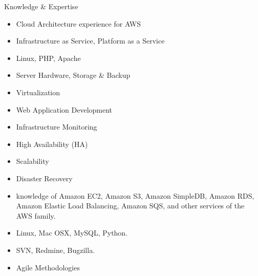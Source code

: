 \documentclass[a4paper,12pt]{article}
\begin{document}
\begin{resumesummary}{Knowledge \& Expertise}
\begin{itemize}
  \item Cloud Architecture experience for AWS
  \item Infrastructure as Service, Platform as a Service
  \item Linux, PHP, Apache
  \item Server Hardware, Storage \& Backup
  \item Virtualization
  \item Web Application Development
  \item Infrastructure Monitoring
  \item High Availability (HA)
  \item Scalability
  \item Disaster Recovery
  \item knowledge of Amazon EC2, Amazon S3, Amazon SimpleDB, Amazon RDS, Amazon Elastic Load Balancing, Amazon SQS, and other services of the AWS family.
  \item Linux, Mac OSX, MySQL, Python.
  \item SVN, Redmine, Bugzilla.
  \item Agile Methodologies
\end{itemize}
\end{resumesummary}
\newpage
\end{document}
